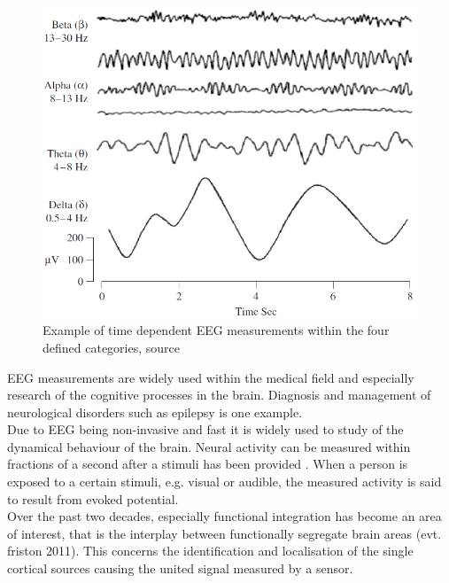 \begin{figure}[H]
\begin{minipage}[t]{.45\textwidth}
        \includegraphics[width=\textwidth]{figurs/EEG_example.png}
        \caption{Example of time dependent EEG measurements within the four defined categories, source \cite{EEGsignalprocessing}}\label{fig:EEG_example}
    \end{minipage}
\end{figure}
\noindent
EEG measurements are widely used within the medical field and especially research of the cognitive processes in the brain. Diagnosis and management of neurological disorders such as epilepsy is one example. 
\\   
Due to EEG being non-invasive and fast it is widely used to study of the dynamical behaviour of the brain. Neural activity can be measured within fractions of a second after a stimuli has been provided \cite[p. 3]{fundamentalEEG}. When a person is exposed to a certain stimuli, e.g. visual or audible, the measured activity is said to result from evoked potential.
\\
Over the past two decades, especially functional integration has become an area of interest, that is the interplay between functionally segregate brain areas \cite{Van2019}(evt. friston 2011). This concerns the identification and localisation of the single cortical sources causing the united signal measured by a sensor.
\\ 
\\
